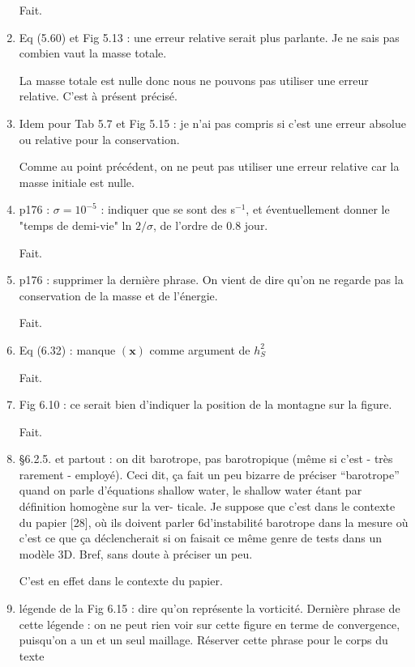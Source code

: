 \documentclass[10pt,a4paper]{article}
\begin{document}
\begin{enumerate}
{\color{blue} Fait.} 

\item Eq (5.60) et Fig 5.13 : une erreur relative serait plus parlante. Je ne sais pas combien vaut la masse totale.

{\color{blue} La masse totale est nulle donc nous ne pouvons pas utiliser une erreur relative. C'est à présent précisé.} 

\item Idem pour Tab 5.7 et Fig 5.15 : je n'ai pas compris si c'est une erreur absolue ou relative pour la conservation.

{\color{blue} Comme au point précédent, on ne peut pas utiliser une erreur relative car la masse initiale est nulle.} 


\item p176 : $\sigma = 10^{-5}$ : indiquer que se sont des s$^{-1}$, et éventuellement donner le "temps de demi-vie" ln $2/\sigma$, de l'ordre de $0.8$ jour.

{\color{blue} Fait.} 

\item p176 : supprimer la dernière phrase. On vient de dire qu'on ne regarde pas la conservation de la masse et de l'énergie.

{\color{blue} Fait.} 


\item Eq (6.32) : manque $(\mathbf{x})$ comme argument de $h_S^2$

{\color{blue} Fait.} 

\item Fig 6.10 : ce serait bien d'indiquer la position de la montagne sur la figure.

{\color{blue} Fait.} 


\item §6.2.5. et partout : on dit barotrope, pas barotropique (même si c’est - très rarement
- employé). Ceci dit, ça fait un peu bizarre de préciser “barotrope” quand on parle
d’équations shallow water, le shallow water étant par définition homogène sur la ver-
ticale. Je suppose que c’est dans le contexte du papier [28], où ils doivent parler
6d’instabilité barotrope dans la mesure où c’est ce que ça déclencherait si on faisait ce
même genre de tests dans un modèle 3D. Bref, sans doute à préciser un peu.

{\color{blue} C'est en effet dans le contexte du papier.} 


\item légende de la Fig 6.15 : dire qu’on représente la vorticité. Dernière phrase de cette
légende : on ne peut rien voir sur cette figure en terme de convergence, puisqu’on a un
et un seul maillage. Réserver cette phrase pour le corps du texte


\end{enumerate}
\end{document}
